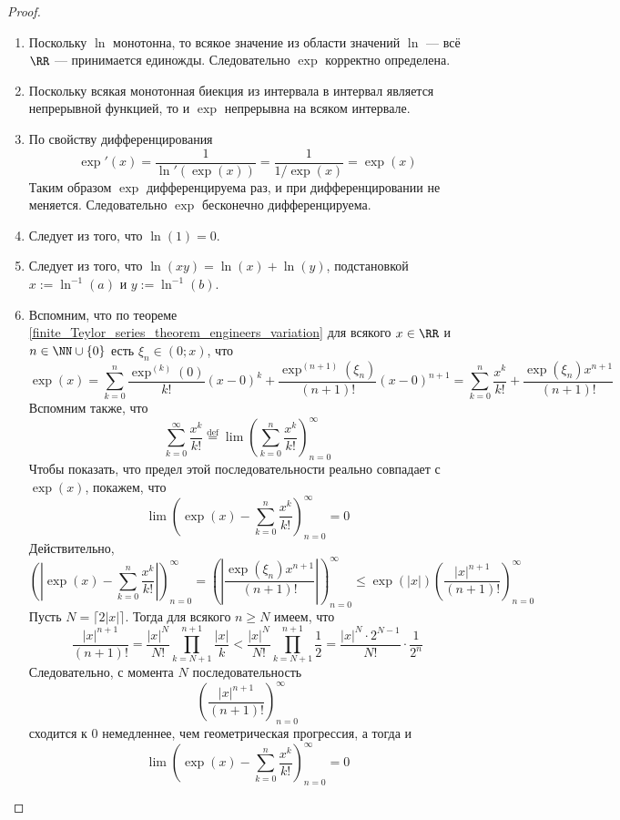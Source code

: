 \documentclass[12pt,a4paper]{article}
\begin{document}
    \begin{proof}\ 
        \begin{enumerate}
            \item Поскольку $\ln$ монотонна, то всякое значение из области значений $\ln$ --- всё $\RR$ --- принимается единожды. Следовательно $\exp$ корректно определена.
            \item Поскольку всякая монотонная биекция из интервала в интервал является непрерывной функцией, то и $\exp$ непрерывна на всяком интервале.
            \item По свойству дифференцирования
                \[\exp'(x) = \frac{1}{\ln'(\exp(x))} = \frac{1}{1/\exp(x)} = \exp(x)\]
                Таким образом $\exp$ дифференцируема раз, и при дифференцировании не меняется. Следовательно $\exp$ бесконечно дифференцируема.
            \item Следует из того, что $\ln(1) = 0$.
            \item Следует из того, что $\ln(xy) = \ln(x) + \ln(y)$, подстановкой $x := \ln^{-1}(a)$ и $y := \ln^{-1}(b)$.
            \item Вспомним, что по теореме \ref{finite_Teylor_series_theorem_engineers_variation} для всякого $x \in \RR$ и $n \in \NN \cup \{0\}$ есть $\xi_n \in (0; x)$, что
                \[
                    \exp(x)
                    = \sum_{k=0}^n \frac{\exp^{(k)}(0)}{k!}(x-0)^k + \frac{\exp^{(n+1)}(\xi_n)}{(n+1)!}(x-0)^{n+1}
                    = \sum_{k=0}^n \frac{x^k}{k!} + \frac{\exp(\xi_n)x^{n+1}}{(n+1)!}
                \]
                Вспомним также, что
                \[
                    \sum_{k=0}^\infty \frac{x^k}{k!} \stackrel{\mathrm{def}}{=} \lim \left(\sum_{k=0}^n \frac{x^k}{k!}\right)_{n=0}^\infty
                \]
                Чтобы показать, что предел этой последовательности реально совпадает с $\exp(x)$, покажем, что
                \[\lim \left(\exp(x) - \sum_{k=0}^n \frac{x^k}{k!}\right)_{n=0}^\infty = 0\]
                Действительно,
                \[
                    \left(\left|\exp(x) - \sum_{k=0}^n \frac{x^k}{k!}\right|\right)_{n=0}^\infty
                    = \left(\left|\frac{\exp(\xi_n)x^{n+1}}{(n+1)!}\right|\right)_{n=0}^\infty
                    \leqslant \exp(|x|) \left(\frac{|x|^{n+1}}{(n+1)!}\right)_{n=0}^\infty
                \]
                Пусть $N = \lceil 2|x| \rceil$. Тогда для всякого $n \geqslant N$ имеем, что
                \[
                    \frac{|x|^{n+1}}{(n+1)!}
                    = \frac{|x|^N}{N!} \prod_{k=N+1}^{n+1} \frac{|x|}{k}
                    < \frac{|x|^N}{N!} \prod_{k=N+1}^{n+1} \frac{1}{2}
                    = \frac{|x|^N\cdot 2^{N-1}}{N!} \cdot \frac{1}{2^n}
                \]
                Следовательно, с момента $N$ последовательность
                \[\left(\frac{|x|^{n+1}}{(n+1)!}\right)_{n=0}^\infty\]
                сходится к $0$ немедленнее, чем геометрическая прогрессия, а тогда и
                \[\lim \left(\exp(x) - \sum_{k=0}^n \frac{x^k}{k!}\right)_{n=0}^\infty = 0\]
        \end{enumerate}
    \end{proof}
\end{document}
